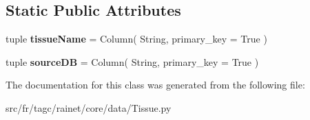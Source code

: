 \subsection*{Static Public Attributes}
\begin{DoxyCompactItemize}
\item 
\hypertarget{classsrc_1_1fr_1_1tagc_1_1rainet_1_1core_1_1data_1_1Tissue_1_1Tissue_a6c2e29faa3b297e72cca11fe1fbf9106}{tuple {\bfseries tissue\-Name} = Column( String, primary\-\_\-key = True )}\label{classsrc_1_1fr_1_1tagc_1_1rainet_1_1core_1_1data_1_1Tissue_1_1Tissue_a6c2e29faa3b297e72cca11fe1fbf9106}

\item 
\hypertarget{classsrc_1_1fr_1_1tagc_1_1rainet_1_1core_1_1data_1_1Tissue_1_1Tissue_ae2528ef11fd0d3e7ca61c17c570a30b4}{tuple {\bfseries source\-D\-B} = Column( String, primary\-\_\-key = True )}\label{classsrc_1_1fr_1_1tagc_1_1rainet_1_1core_1_1data_1_1Tissue_1_1Tissue_ae2528ef11fd0d3e7ca61c17c570a30b4}

\end{DoxyCompactItemize}


The documentation for this class was generated from the following file\-:\begin{DoxyCompactItemize}
\item 
src/fr/tagc/rainet/core/data/Tissue.\-py\end{DoxyCompactItemize}
